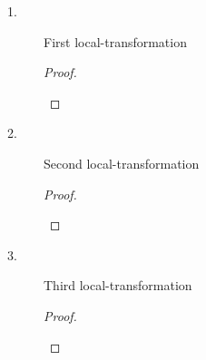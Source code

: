 \begin{description}
\item[1.] First local-transformation
\begin{proof}~

\begin{tabbing}

\end{tabbing}
\end{proof}

\item[2.] Second local-transformation
\begin{proof}~

\begin{tabbing}

\end{tabbing}
\end{proof}

\item[3.] Third local-transformation
\begin{proof}~

\begin{tabbing}

\end{tabbing}
\end{proof}
\end{description}




